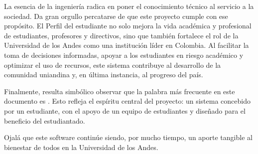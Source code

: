La esencia de la ingeniería radica en poner el conocimiento técnico al servicio a la sociedad. Da gran orgullo percatarse de que este proyecto cumple con ese propósito. El Perfil del estudiante no solo mejora la vida académica y profesional de estudiantes, profesores y directivos, sino que también fortalece el rol de la Universidad de los Andes como una institución líder en Colombia. Al facilitar la toma de decisiones informadas, apoyar a los estudiantes en riesgo académico y optimizar el uso de recursos, este sistema contribuye al desarrollo de la comunidad uniandina y, en última instancia, al progreso del país.

Finalmente, resulta simbólico observar que la palabra más frecuente en este documento es . Esto refleja el espíritu central del proyecto: un sistema concebido por un estudiante, con el apoyo de un equipo de estudiantes y diseñado para el beneficio del estudiantado.

Ojalá que este software continúe siendo, por mucho tiempo, un aporte tangible al bienestar de todos en la Universidad de los Andes.